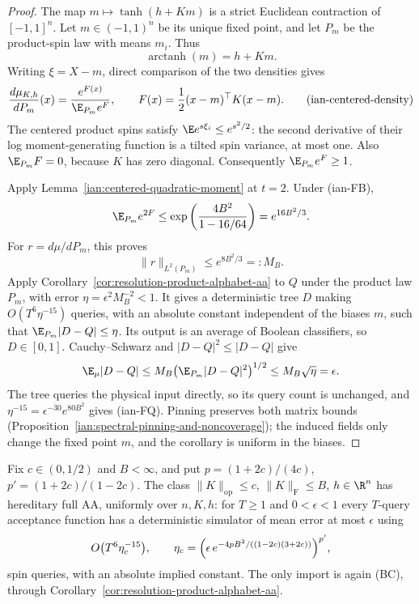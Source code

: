 \begin{proof}
The map \(m\mapsto\tanh(h+Km)\) is a strict Euclidean contraction of
\([-1,1]^n\). Let \(m\in(-1,1)^n\) be its unique fixed point, and let
\(P_m\) be the product-spin law with means \(m_i\). Thus
\[
 \operatorname{arctanh}(m)=h+Km.
\]
Writing \(\xi=X-m\), direct comparison of the two densities gives
\[
 \frac{d\mu_{K,h}}{dP_m}(x)
 =\frac{e^{F(x)}}{\E_{P_m}e^F},
 \qquad F(x)=\frac12(x-m)^\top K(x-m).
 \tag{ian-centered-density}
\]
The centered product spins satisfy
\(\E e^{s\xi_i}\le e^{s^2/2}\): the second derivative of their log
moment-generating function is a tilted spin variance, at most one.
Also \(\E_{P_m}F=0\), because \(K\) has zero diagonal.
Consequently \(\E_{P_m}e^F\ge1\).

Apply Lemma~\ref{ian:centered-quadratic-moment} at \(t=2\).
Under (ian-FB),
\[
 \E_{P_m}e^{2F}
 \le\exp\left(\frac{4B^2}{1-16/64}\right)
 =e^{16B^2/3}.
\]
For \(r=d\mu/dP_m\), this proves
\[
 \|r\|_{L^2(P_m)}\le e^{8B^2/3}=:M_B.
\]
Apply Corollary~\ref{cor:resolution-product-alphabet-aa} to \(Q\)
under the product law \(P_m\), with error
\(\eta=\epsilon^2M_B^{-2}<1\). It gives a deterministic tree \(D\)
making \(O(T^6\eta^{-15})\) queries, with an absolute constant
independent of the biases \(m\), such that
\(\E_{P_m}|D-Q|\le\eta\). Its output is an average of Boolean
classifiers, so \(D\in[0,1]\). Cauchy--Schwarz and
\(|D-Q|^2\le|D-Q|\) give
\[
 \E_\mu|D-Q|
 \le M_B\bigl(\E_{P_m}|D-Q|^2\bigr)^{1/2}
 \le M_B\sqrt\eta=\epsilon.
\]
The tree queries the physical input directly, so its query count is
unchanged, and \(\eta^{-15}=\epsilon^{-30}e^{80B^2}\) gives (ian-FQ).
Pinning preserves both matrix bounds
(Proposition~\ref{ian:spectral-pinning-and-noncoverage}); the induced
fields only change the fixed point \(m\), and the corollary is uniform
in the biases.
\end{proof}

\begin{corollary}
\label{ian:frobenius-full-aa-half}
Fix \(c\in(0,1/2)\) and \(B<\infty\), and put
\(p=(1+2c)/(4c)\), \(p'=(1+2c)/(1-2c)\). The class
\(\|K\|_{\mathrm{op}}\le c\), \(\|K\|_{\mathrm F}\le B\), \(h\in\R^n\)
has hereditary full AA, uniformly over \(n,K,h\): for \(T\ge1\) and
\(0<\epsilon<1\) every \(T\)-query acceptance function has a
deterministic simulator of mean error at most \(\epsilon\) using
\[
 O\bigl(T^6\eta_c^{-15}\bigr),\qquad
 \eta_c=\Bigl(\epsilon\,e^{-4pB^2/((1-2c)(3+2c))}\Bigr)^{p'},
\]
spin queries, with an absolute implied constant. The only import is
again (BC), through
Corollary~\ref{cor:resolution-product-alphabet-aa}.
\end{corollary}

